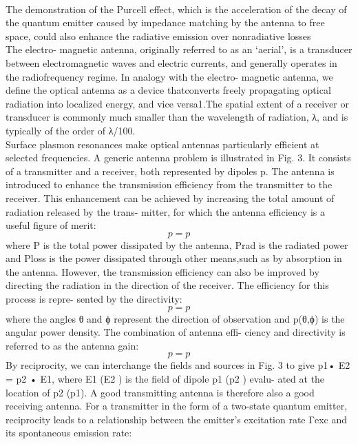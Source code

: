 	\\
	The demonstration of the Purcell effect, which is the acceleration of the decay of the quantum emitter caused by impedance matching by the antenna to free space, could also enhance the radiative emission over nonradiative losses
	\\
	\cite{Novotny2011}
	The electro- magnetic antenna, originally referred to as an ‘aerial’, is a transducer between electromagnetic waves and electric currents, and generally operates in the radiofrequency regime. In analogy with the electro- magnetic antenna, we define the optical antenna as a device thatconverts freely propagating optical radiation into localized energy, and vice versa1.The spatial extent of a receiver or transducer is commonly much smaller than the wavelength of radiation, λ, and is typically of the order of λ/100.
	\\
	Surface plasmon resonances make optical antennas particularly efficient at selected frequencies. A generic antenna problem is illustrated in Fig. 3. It consists of a transmitter and a receiver, both represented by dipoles p. The antenna is introduced to enhance the transmission efficiency from the transmitter to the receiver. This enhancement can be achieved by increasing the total amount of radiation released by the trans- mitter, for which the antenna efficiency is a useful figure of merit:
	\begin{equation}
		p=p
	\end{equation}
	where P is the total power dissipated by the antenna, Prad is the radiated power and Ploss is the power dissipated through other means,such as by absorption in the antenna. However, the transmission efficiency can also be improved by directing the radiation in the direction of the receiver. The efficiency for this process is repre- sented by the directivity:
	\begin{equation}
		p=p
	\end{equation}
	where the angles θ and ϕ represent the direction of observation and p(θ,ϕ) is the angular power density. The combination of antenna effi- ciency and directivity is referred to as the antenna gain:
	\begin{equation}
		p=p
	\end{equation}
	By reciprocity, we can interchange the fields and sources in Fig. 3 to give p1• E2 = p2 • E1, where E1 (E2 ) is the field of dipole p1 (p2 ) evalu- ated at the location of p2 (p1). A good transmitting antenna is therefore also a good receiving antenna. For a transmitter in the form of a two-state quantum emitter, reciprocity leads to a relationship between the emitter’s excitation rate Γexc and its spontaneous emission rate:

